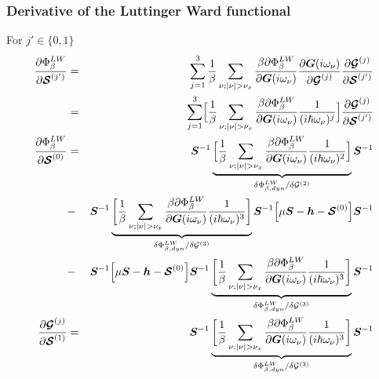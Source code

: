 \documentclass[11pt,a4paper]{report}
\begin{document}
\subsubsection{Derivative of the Luttinger Ward functional}
For $j'\in\{0,1\}$
\begin{eqnarray}
\frac{\partial\Phi^{LW}_\beta}{\partial \mat{\mathcal{S}}^{(j')}}
&=&
\sum_{j=1}^3
\frac{1}{\beta}\sum_{\nu; |\nu|>\nu_x}
\frac{\beta\partial\Phi^{LW}_\beta}{\partial \mat{G}(i\omega_\nu)}
\frac{\partial \mat{G}(i\omega_\nu)}{\partial \mat{\mathcal{G}}^{(j)}}
\frac{\partial \mat{\mathcal{G}}^{(j)}}{\partial \mat{\mathcal{S}}^{(j')}}
\nonumber\\
&=&
\sum_{j=1}^3
\Bigl[\frac{1}{\beta}\sum_{\nu; |\nu|>\nu_x}
\frac{\beta\partial\Phi^{LW}_\beta}{\partial \mat{G}(i\omega_\nu)}
\frac{1}{(i\hbar\omega_\nu)^j}\Bigr]
\frac{\partial \mat{\mathcal{G}}^{(j)}}{\partial \mat{\mathcal{S}}^{(j')}}
\nonumber\\
\frac{\partial\Phi^{LW}_\beta}{\partial \mat{\mathcal{S}}^{(0)}}
&=&
\mat{S}^{-1}
\underbrace{\Bigl[\frac{1}{\beta}\sum_{\nu; |\nu|>\nu_x}
\frac{\beta\partial\Phi^{LW}_\beta}{\partial \mat{G}(i\omega_\nu)}
\frac{1}{(i\hbar\omega_\nu)^2}\Bigr]}
_{\delta\Phi^{LW}_{\beta,dyn}/\delta\mathcal{\mat{G}}^{(2)}}
\mat{S}^{-1}
\nonumber\\
&-&
\mat{S}^{-1}
\underbrace{\biggl[\frac{1}{\beta}\sum_{\nu; |\nu|>\nu_x}
\frac{\beta\partial\Phi^{LW}_\beta}{\partial \mat{G}(i\omega_\nu)}
\frac{1}{(i\hbar\omega_\nu)^3}\biggr]}
_{\delta\Phi^{LW}_{\beta,dyn}/\delta\mathcal{\mat{G}}^{(3)}}
\mat{S}^{-1}\Bigl[\mu\mat{S}-\mat{h}-\mat{\mathcal{S}}^{(0)}\Bigr]\mat{S}^{-1}
\nonumber\\
&-&
\mat{S}^{-1}
\Bigl[\mu\mat{S}-\mat{h}-\mat{\mathcal{S}}^{(0)}\Bigr]\mat{S}^{-1}
\underbrace{\biggl[\frac{1}{\beta}\sum_{\nu; |\nu|>\nu_x}
\frac{\beta\partial\Phi^{LW}_\beta}{\partial \mat{G}(i\omega_\nu)}
\frac{1}{(i\hbar\omega_\nu)^3}\biggr]}
_{\delta\Phi^{LW}_{\beta,dyn}/\delta\mathcal{\mat{G}}^{(3)}}
\mat{S}^{-1}
%
\nonumber\\
\frac{\partial \mat{\mathcal{G}}^{(j)}}{\partial \mat{\mathcal{S}}^{(1)}}
&=&\mat{S}^{-1}
\underbrace{\biggl[\frac{1}{\beta}\sum_{\nu; |\nu|>\nu_x}
\frac{\beta\partial\Phi^{LW}_\beta}{\partial \mat{G}(i\omega_\nu)}
\frac{1}{(i\hbar\omega_\nu)^3}\biggr]}
_{\delta\Phi^{LW}_{\beta,dyn}/\delta\mathcal{\mat{G}}^{(3)}}
\mat{S}^{-1}
\end{eqnarray}

\end{document}
